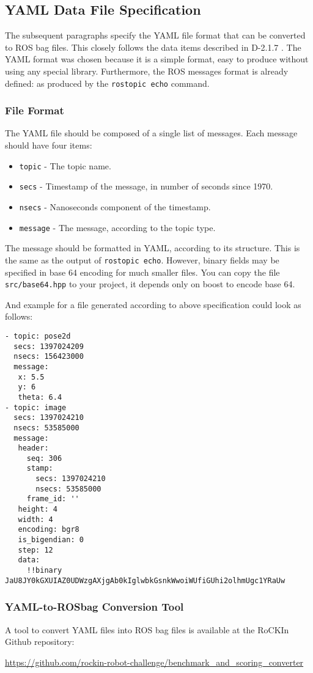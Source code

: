 \subsection{YAML Data File Specification} \label{sssec:YamlDataFileSpec}
The subsequent paragraphs specify the YAML file format that can be converted to ROS bag files. This closely follows the data items described in D-2.1.7 \cite{rockin:D-2.1.7:2014}. The YAML format was chosen because it is a simple format, easy to produce without using any special library. Furthermore, the ROS messages format is already defined: as produced by the \verb!rostopic echo! command.

\subsubsection{File Format}
The YAML file should be composed of a single list of messages. Each message should have four items:
\begin{itemize}
 \item \verb!topic! - The topic name.
 \item \verb!secs! - Timestamp of the message, in number of seconds since 1970.
 \item \verb!nsecs! - Nanoseconds component of the timestamp.
 \item \verb!message! - The message, according to the topic type.
\end{itemize}

The message should be formatted in YAML, according to its structure. This is the same as the output of \verb!rostopic echo!. However, binary fields may be specified in base 64 encoding for much smaller files. You can copy the file \verb!src/base64.hpp! to your project, it depends only on boost to encode base 64.

And example for a file generated according to above specification could look as follows:
\begin{verbatim}
- topic: pose2d
  secs: 1397024209
  nsecs: 156423000
  message:
   x: 5.5
   y: 6
   theta: 6.4
- topic: image
  secs: 1397024210
  nsecs: 53585000
  message:
   header:
     seq: 306
     stamp:
       secs: 1397024210
       nsecs: 53585000
     frame_id: ''
   height: 4
   width: 4
   encoding: bgr8
   is_bigendian: 0
   step: 12
   data:
     !!binary JaU8JY0kGXUIAZ0UDWzgAXjgAb0kIglwbkGsnkWwoiWUfiGUhi2olhmUgc1YRaUw
\end{verbatim}

\subsubsection{YAML-to-ROSbag Conversion Tool}
A tool to convert \erl YAML files into ROS bag files is available at the RoCKIn Github repository:
\begin{center}
	\url{https://github.com/rockin-robot-challenge/benchmark_and_scoring_converter}
\end{center}